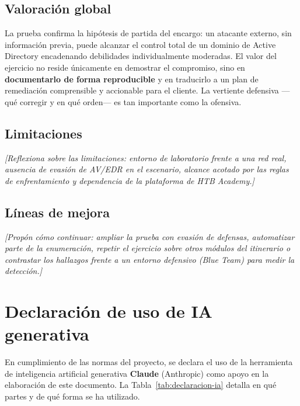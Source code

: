 \documentclass[11pt,a4paper,oneside]{report}
\newcommand{\guia}[1]{{\color{guia}\itshape[#1]}}
\begin{document}
\section{Valoración global}

La prueba confirma la hipótesis de partida del encargo: un atacante externo, sin información previa, puede alcanzar el control total de un dominio de Active Directory encadenando debilidades individualmente moderadas. El valor del ejercicio no reside únicamente en demostrar el compromiso, sino en \textbf{documentarlo de forma reproducible} y en traducirlo a un plan de remediación comprensible y accionable para el cliente. La vertiente defensiva —qué corregir y en qué orden— es tan importante como la ofensiva.

\section{Limitaciones}
\guia{Reflexiona sobre las limitaciones: entorno de laboratorio frente a una red real, ausencia de evasión de AV/EDR en el escenario, alcance acotado por las reglas de enfrentamiento y dependencia de la plataforma de HTB Academy.}

\section{Líneas de mejora}
\guia{Propón cómo continuar: ampliar la prueba con evasión de defensas, automatizar parte de la enumeración, repetir el ejercicio sobre otros módulos del itinerario o contrastar los hallazgos frente a un entorno defensivo (Blue Team) para medir la detección.}

\chapter*{Declaración de uso de IA generativa}

En cumplimiento de las normas del proyecto, se declara el uso de la herramienta de inteligencia artificial generativa \textbf{Claude} (Anthropic) como apoyo en la elaboración de este documento. La Tabla~\ref{tab:declaracion-ia} detalla en qué partes y de qué forma se ha utilizado.
\end{document}
